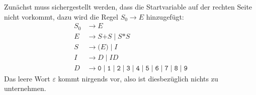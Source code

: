 \begin{loesung}
\begin{teilaufgaben}
\item 
Zunächst muss sichergestellt werden, dass die Startvariable auf der rechten
Seite nicht vorkommt, dazu wird die Regel $S_0\to E$ hinzugefügt:
\begin{align*}
S_0&\to E \\
E&\to S\texttt{+}S \mid S\texttt{*}S \\
S&\to \texttt{(}E\texttt{)} \mid I \\
I&\to D \mid I D \\
D&\to
\texttt{0}
\mid
\texttt{1}
\mid
\texttt{2}
\mid
\texttt{3}
\mid
\texttt{4}
\mid
\texttt{5}
\mid
\texttt{6}
\mid
\texttt{7}
\mid
\texttt{8}
\mid
\texttt{9}
\end{align*}
Das leere Wort $\varepsilon$ kommt nirgends vor, also ist diesbezüglich
nichts zu unternehmen.


\end{teilaufgaben}
\end{loesung}
